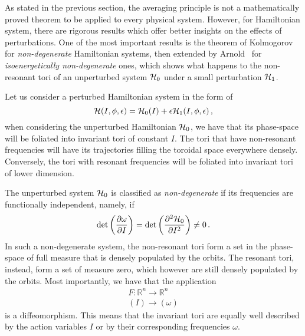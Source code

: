 As stated in the previous section, the averaging principle is not a mathematically proved theorem to be applied to every physical system. However, for Hamiltonian system, there are rigorous results which offer better insights on the effects of perturbations. One of the most important results is the theorem of Kolmogorov~\cite{KAM1} for \textit{non-degenerate} Hamiltonian systems, then extended by Arnold~\cite{KAM3} for \textit{isoenergetically non-degenerate} ones, which shows what happens to the non-resonant tori of an unperturbed system $\mathcal{H}_0$ under a small perturbation $\mathcal{H}_1$.

Let us consider a perturbed Hamiltonian system in the form of
\begin{equation}
    \mathcal{H}(I, \phi, \epsilon) = \mathcal{H}_0(I) + \epsilon\mathcal{H}_1(I,\phi,\epsilon)\,,
    \label{eq:1:hamperturbed}
\end{equation}
when considering the unperturbed Hamiltonian $\mathcal{H}_0$, we have that its phase-space will be foliated into invariant tori of constant $I$. The tori that have non-resonant frequencies will have its trajectories filling the toroidal space everywhere densely. Conversely, the tori with resonant frequencies will be foliated into invariant tori of lower dimension.

The unperturbed system $\mathcal{H}_0$ is classified as \textit{non-degenerate} if its frequencies are functionally independent, namely, if
\begin{equation}
    \det\left(\pdv{\omega}{I}\right) = \det\left(\pdv[2]{\mathcal{H}_0}{I}\right) \neq 0 \,.
\end{equation}
In such a non-degenerate system, the non-resonant tori form a set in the phase-space of full measure that is densely populated by the orbits. The resonant tori, instead, form a set of measure zero, which however are still densely populated by the orbits. Most importantly, we have that the application
\begin{equation}
    \begin{array}{r}
    F: \mathbb{R}^{n} \longrightarrow \mathbb{R}^n \\
    (I) \longrightarrow(\omega)
    \end{array}
\end{equation}
is a diffeomorphism. This means that the invariant tori are equally well described by the action variables $I$ or by their corresponding frequencies $\omega$.

